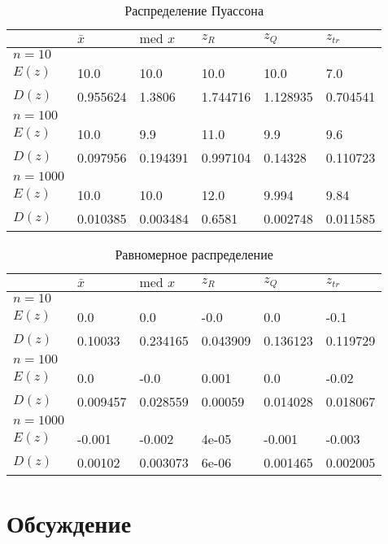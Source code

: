 \documentclass[12pt,a4paper]{article}
\begin{document}
\begin{table}[h!]
	\centering
	\begin{tabular}{|l|l|l|l|l|l|}
		\hline&$\bar x$ &$\text{med }x$  &$z_R$  &$z_Q$  &$z_{tr}$  \\ \hline
		$n=10$&&&&& \\ \hline$E(z)$&10.0&10.0&10.0&10.0&7.0 \\ \hline$D(z)$&0.955624&1.3806&1.744716&1.128935&0.704541 \\ \hline
		
		$n=100$&&&&& \\ \hline$E(z)$&10.0&9.9&11.0&9.9&9.6 \\ \hline$D(z)$&0.097956&0.194391&0.997104&0.14328&0.110723 \\ \hline
		
		$n=1000$&&&&& \\ \hline$E(z)$&10.0&10.0&12.0&9.994&9.84 \\ \hline$D(z)$&0.010385&0.003484&0.6581&0.002748&0.011585 \\ \hline
	\end{tabular}
	\caption{Распределение Пуассона}
\end{table}

\begin{table}[h!]
	\centering
	\begin{tabular}{|l|l|l|l|l|l|}
		\hline&$\bar x$ &$\text{med }x$  &$z_R$  &$z_Q$  &$z_{tr}$  \\ \hline
		$n=10$&&&&& \\ \hline$E(z)$&0.0&0.0&-0.0&0.0&-0.1 \\ \hline$D(z)$&0.10033&0.234165&0.043909&0.136123&0.119729 \\ \hline
		
		$n=100$&&&&& \\ \hline$E(z)$&0.0&-0.0&0.001&0.0&-0.02 \\ \hline$D(z)$&0.009457&0.028559&0.00059&0.014028&0.018067 \\ \hline
		
		$n=1000$&&&&& \\ \hline$E(z)$&-0.001&-0.002&4e-05&-0.001&-0.003 \\ \hline$D(z)$&0.00102&0.003073&6e-06&0.001465&0.002005 \\ \hline
	\end{tabular}
	\caption{Равномерное распределение}
\end{table}

\pagebreak

\section{Обсуждение}
\end{document}
